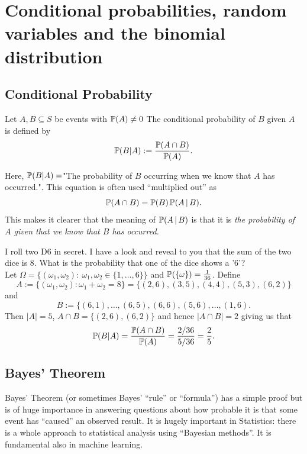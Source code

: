 \section{Conditional probabilities, random variables and the binomial distribution}

\subsection{Conditional Probability}
\begin{defn}
Let $A, B \subseteq S$ be events with ${\mathbb P}(A) \not=0$ The conditional probability of $B$ given $A$ is defined by
\[{\mathbb P}(B \vert A) := \frac{{\mathbb P}(A \cap B)}{{\mathbb P}(A)}.\]
\end{defn}
\noindent Here, ${\mathbb P}( B \vert A)=$"The probability of $B$ occurring when we know that $A$ has occurred.". This equation is often used ``multiplied out'' as
\[{\mathbb P}(A \cap B) = {\mathbb P}(B) \, {\mathbb P}(A \, | \, B). \]
This makes it clearer that the meaning of ${\mathbb P}(A \, | \, B)$ is that it is \emph{the probability of $A$ given that we know that $B$ has occurred.}
\begin{example}
I roll two D6 in secret. I have a look and reveal to you that the sum of the two dice is $8$. What is the probability that one of the dice shows a '$6$'?\\ \linebreak
Let $\Omega = \{ (\omega_1,\omega_2):\ \omega_1,\omega_2 \in \{1, \ldots, 6 \}\}$ and ${\mathbb P}(\{\omega\}) = \frac{1}{36}$. Define 
\[A:=\{ (\omega_1,\omega_2): \omega_1+ \omega_2 = 8 \} = \{ (2,6),(3,5), (4,4), (5,3), (6,2)\}\]
and 
\[B:=\{ (6,1),\ldots,(6,5),(6,6),(5,6),\ldots,(1,6).\]
\linebreak\noindent Then $\vert A \vert =5$, $A \cap B= \{ (2,6),(6,2)\}$ and hence $\vert A \cap B \vert = 2$ giving us that
\[ {\mathbb P}(B \vert A) = \frac{{\mathbb P}(A \cap B)}{{\mathbb P}(A)} = \frac{ 2/36}{5/36} = \frac25.\]
\end{example}

\subsection{Bayes' Theorem} 

Bayes' Theorem (or sometimes Bayes' ``rule'' or ``formula'') has a simple proof but is of huge importance in  answering questions about how probable it is that some event has ``caused'' an observed result.  It is hugely important in Statistics: there is a whole approach to statistical analysis using ``Bayesian methods''.  It is fundamental also in machine learning. 

